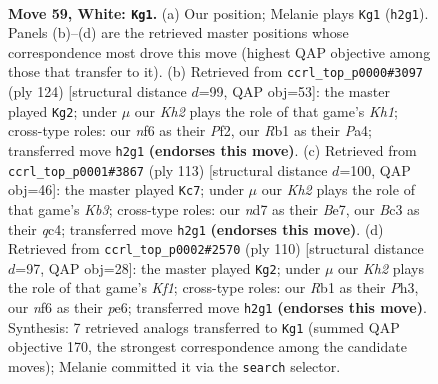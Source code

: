 \documentclass[11pt]{article}
\begin{document}
\clearpage

\begin{figure}[p]\centering
\begin{subfigure}{0.46\textwidth}\centering
\resizebox{\linewidth}{!}{%
\newchessgame
\chessboard[
  setfen={3q3k/3n1p2/b2P1n2/6Q1/p1p4P/2B2pP1/P6K/1R6 w - - 18 59},
  showmover=false,
  pgfstyle=straightmove, color=movearrow, markmove={h2-g1}
]}
\caption{}
\end{subfigure}\hfill
\begin{subfigure}{0.46\textwidth}\centering
\resizebox{\linewidth}{!}{%
\newchessgame
\chessboard[
  setfen={7k/5p2/7p/7P/P5Q1/3pNnP1/4qP2/7K w - - 5 63},
  showmover=false,
  pgfstyle=straightmove, color=movearrow, markmove={h1-g2}
]}
\caption{}
\end{subfigure}
\\[4pt]
\begin{subfigure}{0.46\textwidth}\centering
\resizebox{\linewidth}{!}{%
\newchessgame
\chessboard[
  setfen={8/4b3/1kn5/4p3/p1Q1N3/1pP2P2/1P6/3K1Nq1 b - - 13 57},
  showmover=false,
  pgfstyle=straightmove, color=movearrow, markmove={b6-c7}
]}
\caption{}
\end{subfigure}\hfill
\begin{subfigure}{0.46\textwidth}\centering
\resizebox{\linewidth}{!}{%
\newchessgame
\chessboard[
  setfen={3q4/5p1k/4pnpp/4Q3/3P4/5BPP/5P2/5K2 w - - 20 56},
  showmover=false,
  pgfstyle=straightmove, color=movearrow, markmove={f1-g2}
]}
\caption{}
\end{subfigure}
\caption{\textbf{Move 59, White: \texttt{Kg1}.} (a) Our position; Melanie plays \texttt{Kg1} (\texttt{h2g1}). Panels (b)--(d) are the retrieved master positions whose correspondence most drove this move (highest QAP objective among those that transfer to it). (b) Retrieved from \texttt{ccrl\_top\_p0000\#3097} (ply 124) [structural distance $d$=99, QAP obj=53]: the master played \texttt{Kg2}; under $\mu$ our \emph{Kh2} plays the role of that game's \emph{Kh1}; cross-type roles: our \emph{n}f6 as their \emph{P}f2, our \emph{R}b1 as their \emph{P}a4; transferred move \texttt{h2g1} \textbf{(endorses this move)}. (c) Retrieved from \texttt{ccrl\_top\_p0001\#3867} (ply 113) [structural distance $d$=100, QAP obj=46]: the master played \texttt{Kc7}; under $\mu$ our \emph{Kh2} plays the role of that game's \emph{Kb3}; cross-type roles: our \emph{n}d7 as their \emph{B}e7, our \emph{B}c3 as their \emph{q}c4; transferred move \texttt{h2g1} \textbf{(endorses this move)}. (d) Retrieved from \texttt{ccrl\_top\_p0002\#2570} (ply 110) [structural distance $d$=97, QAP obj=28]: the master played \texttt{Kg2}; under $\mu$ our \emph{Kh2} plays the role of that game's \emph{Kf1}; cross-type roles: our \emph{R}b1 as their \emph{P}h3, our \emph{n}f6 as their \emph{p}e6; transferred move \texttt{h2g1} \textbf{(endorses this move)}. Synthesis: 7 retrieved analogs transferred to \texttt{Kg1} (summed QAP objective 170, the strongest correspondence among the candidate moves); Melanie committed it via the \texttt{search} selector.}
\label{fig:thought-m116}
\end{figure}
\end{document}
